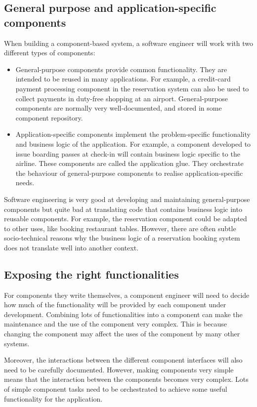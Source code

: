 \documentclass[a4paper, openany]{memoir}
\begin{document}
\subsection{General purpose and application-specific components}
When building a component-based system, a software engineer will work with two different types of components:
\begin{itemize}
    \item General-purpose components provide common functionality. They are intended to be reused in many applications. For example, a credit-card payment processing component in the reservation system can also be used to collect payments in duty-free shopping at an airport. General-purpose components are normally very well-documented, and stored in some component repository.
    
    \item Application-specific components implement the problem-specific functionality and business logic of the application. For example, a component developed to issue boarding passes at check-in will contain business logic specific to the airline. These components are called the application glue. They orchestrate the behaviour of general-purpose components to realise application-specific needs.
\end{itemize}

Software engineering is very good at developing and maintaining general-purpose components but quite bad at translating code that contains business logic into reusable components. For example, the reservation component could be adapted to other uses, like booking restaurant tables. However, there are often subtle socio-technical reasons why the business logic of a reservation booking system does not translate well into another context.

\subsection{Exposing the right functionalities}
For components they write themselves, a component engineer will need to decide how much of the functionality will be provided by each component under development. Combining lots of functionalities into a component can make the maintenance and the use of the component very complex. This is because changing the component may affect the uses of the component by many other systems. 

Moreover, the interactions between the different component interfaces will also need to be carefully documented. However, making components very simple means that the interaction between the components becomes very complex. Lots of simple component tasks need to be orchestrated to achieve some useful functionality for the application.
\end{document}
